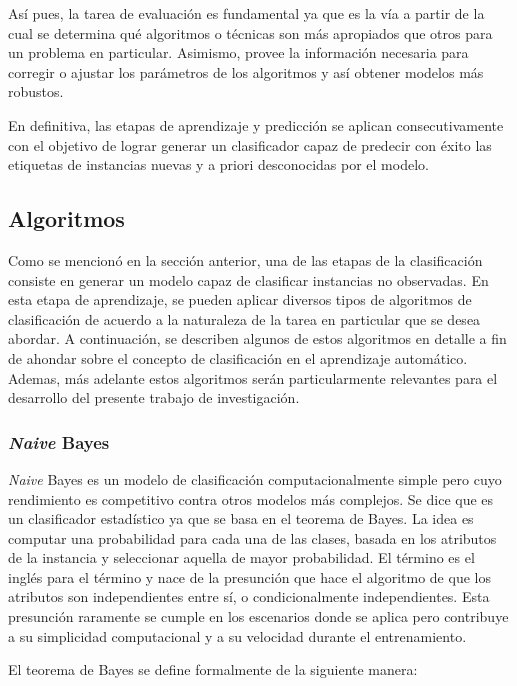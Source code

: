 Así pues, la tarea de evaluación es fundamental ya que es la vía a partir de la
cual se determina qué algoritmos o técnicas son más apropiados que otros para un
problema en particular. Asimismo, provee la información necesaria para corregir
o ajustar los parámetros de los algoritmos y así obtener modelos más robustos. 

En definitiva, las etapas de aprendizaje y predicción se aplican
consecutivamente con el objetivo de lograr generar un clasificador capaz de
predecir con éxito las etiquetas de instancias nuevas y a priori desconocidas
por el modelo.

\subsection{Algoritmos}
\label{clasificacion_algoritmos}

Como se mencionó en la sección anterior, una de las etapas de la clasificación
consiste en generar un modelo capaz de clasificar instancias no observadas. En
esta etapa de aprendizaje, se pueden aplicar diversos tipos de algoritmos de
clasificación de acuerdo a la naturaleza de la tarea en particular que se desea
abordar. A continuación, se describen algunos de estos algoritmos en detalle a
fin de ahondar sobre el concepto de clasificación en el aprendizaje automático.
Ademas, más adelante estos algoritmos serán particularmente relevantes para el
desarrollo del presente trabajo de investigación.

\subsubsection{\textit{Naive} Bayes}

\textit{Naive} Bayes es un modelo de clasificación computacionalmente simple
pero cuyo rendimiento es competitivo contra otros modelos más complejos. Se dice
que es un clasificador estadístico ya que se basa en el teorema de Bayes. La
idea es computar una probabilidad para cada una de las clases, basada en los
atributos de la instancia y seleccionar aquella de mayor probabilidad. El
término  es el inglés para el término
 y nace de la presunción que hace el algoritmo de que
los atributos son independientes entre sí, o condicionalmente independientes.
Esta presunción raramente se cumple en los escenarios donde se aplica pero
contribuye a su simplicidad computacional y a su velocidad durante el
entrenamiento.

El teorema de Bayes se define formalmente de la siguiente manera:

